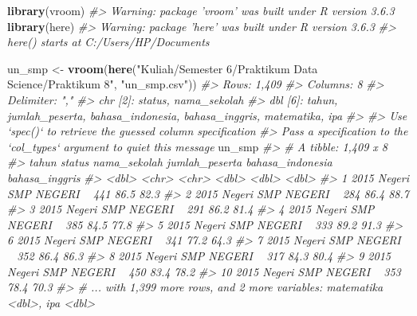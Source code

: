 \documentclass[
]{article}
\newenvironment{Shaded}{\begin{snugshade}}{\end{snugshade}}
\newcommand{\CommentTok}[1]{\textcolor[rgb]{0.56,0.35,0.01}{\textit{#1}}}
\newcommand{\KeywordTok}[1]{\textcolor[rgb]{0.13,0.29,0.53}{\textbf{#1}}}
\newcommand{\NormalTok}[1]{#1}
\newcommand{\StringTok}[1]{\textcolor[rgb]{0.31,0.60,0.02}{#1}}
\begin{document}
\begin{Shaded}
\begin{Highlighting}[]
\KeywordTok{library}\NormalTok{(vroom)}
\CommentTok{#> Warning: package 'vroom' was built under R version 3.6.3}
\KeywordTok{library}\NormalTok{(here)}
\CommentTok{#> Warning: package 'here' was built under R version 3.6.3}
\CommentTok{#> here() starts at C:/Users/HP/Documents}
\end{Highlighting}
\end{Shaded}

\begin{Shaded}
\begin{Highlighting}[]
\NormalTok{un_smp <-}\StringTok{ }\KeywordTok{vroom}\NormalTok{(}\KeywordTok{here}\NormalTok{(}\StringTok{"Kuliah/Semester 6/Praktikum Data Science/Praktikum 8"}\NormalTok{, }\StringTok{"un_smp.csv"}\NormalTok{))}
\CommentTok{#> Rows: 1,409}
\CommentTok{#> Columns: 8}
\CommentTok{#> Delimiter: ","}
\CommentTok{#> chr [2]: status, nama_sekolah}
\CommentTok{#> dbl [6]: tahun, jumlah_peserta, bahasa_indonesia, bahasa_inggris, matematika, ipa}
\CommentTok{#> }
\CommentTok{#> Use `spec()` to retrieve the guessed column specification}
\CommentTok{#> Pass a specification to the `col_types` argument to quiet this message}
\NormalTok{un_smp}
\CommentTok{#> # A tibble: 1,409 x 8}
\CommentTok{#>    tahun status nama_sekolah jumlah_peserta bahasa_indonesia bahasa_inggris}
\CommentTok{#>    <dbl> <chr>  <chr>                 <dbl>            <dbl>          <dbl>}
\CommentTok{#>  1  2015 Negeri SMP NEGERI ~            441             86.5           82.3}
\CommentTok{#>  2  2015 Negeri SMP NEGERI ~            284             86.4           88.7}
\CommentTok{#>  3  2015 Negeri SMP NEGERI ~            291             86.2           81.4}
\CommentTok{#>  4  2015 Negeri SMP NEGERI ~            385             84.5           77.8}
\CommentTok{#>  5  2015 Negeri SMP NEGERI ~            333             89.2           91.3}
\CommentTok{#>  6  2015 Negeri SMP NEGERI ~            341             77.2           64.3}
\CommentTok{#>  7  2015 Negeri SMP NEGERI ~            352             86.4           86.3}
\CommentTok{#>  8  2015 Negeri SMP NEGERI ~            317             84.3           80.4}
\CommentTok{#>  9  2015 Negeri SMP NEGERI ~            450             83.4           78.2}
\CommentTok{#> 10  2015 Negeri SMP NEGERI ~            353             78.4           70.3}
\CommentTok{#> # ... with 1,399 more rows, and 2 more variables: matematika <dbl>, ipa <dbl>}
\end{Highlighting}
\end{Shaded}
\end{document}
